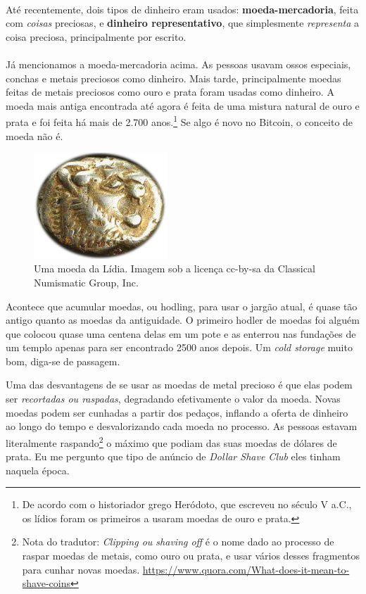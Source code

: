 \paragraph{}
Até recentemente, dois tipos de dinheiro eram usados: \textbf{moeda-mercadoria}, feita com \textit{coisas} preciosas, e \textbf{dinheiro representativo}, que simplesmente \textit{representa} a coisa preciosa, principalmente por escrito.

\paragraph{}
Já mencionamos a moeda-mercadoria acima. As pessoas usavam ossos especiais, conchas e metais preciosos como dinheiro. Mais tarde, principalmente moedas feitas de metais preciosos como ouro e prata foram usadas como dinheiro. A moeda mais antiga encontrada até agora é feita de uma mistura natural de ouro e prata e foi feita há mais de 2.700 anos.\footnote{De acordo com o historiador grego Heródoto, que escreveu no século V a.C., os lídios foram os primeiros a usaram moedas de ouro e prata.\cite{coinage-origins}} Se algo é novo no Bitcoin, o conceito de moeda não é.

\begin{figure}
  \centering
  \includegraphics[width=5cm]{assets/images/lydian-coin-stater.png}
  \caption{Uma moeda da Lídia. Imagem sob a licença cc-by-sa da Classical Numismatic Group, Inc.}
  \label{fig:lydian-coin-stater}
\end{figure}

Acontece que acumular moedas, ou hodling, para usar o jargão atual, é quase tão antigo quanto as moedas da antiguidade. O primeiro hodler de moedas foi alguém que colocou quase uma centena delas em um pote e as enterrou nas fundações de um templo apenas para ser encontrado 2500 anos depois. Um \textit{cold storage} muito bom, diga-se de passagem.

Uma das desvantagens de se usar as moedas de metal precioso é que elas podem ser \textit{recortadas ou raspadas}, degradando efetivamente o valor da moeda. Novas moedas podem ser cunhadas a partir dos pedaços, inflando a oferta de dinheiro ao longo do tempo e desvalorizando cada moeda no processo. As pessoas estavam literalmente raspando\footnote{Nota do tradutor: \textit{Clipping ou shaving off} é o nome dado ao processo de raspar moedas de metais, como ouro ou prata, e usar vários desses fragmentos para cunhar novas moedas. \url{https://www.quora.com/What-does-it-mean-to-shave-coins}} o máximo que podiam das suas moedas de dólares de prata. Eu me pergunto que tipo de anúncio de \textit{Dollar Shave Club} eles tinham naquela época.

